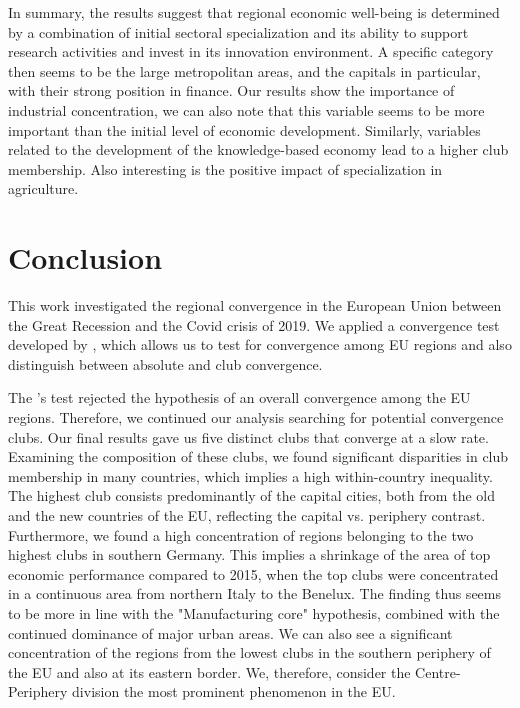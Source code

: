 \documentclass[11pt]{article}
\begin{document}
In summary, the results suggest that regional economic well-being is determined by a combination of initial sectoral specialization and its ability to support research activities and invest in its innovation environment. A specific category then seems to be the large metropolitan areas, and the capitals in particular, with their strong position in finance. Our results show the importance of industrial concentration, we can also note that this variable seems to be more important than the initial level of economic development. Similarly, variables related to the development of the knowledge-based economy lead to a higher club membership. Also interesting is the positive impact of specialization in agriculture. 

\section{Conclusion}

This work investigated the regional convergence in the European Union between the Great Recession and the Covid crisis of 2019. We applied a convergence test developed by \citet{phillips2009economic}, which allows us to test for convergence among EU regions and also distinguish between absolute and club convergence.

The \citeauthor{phillips2009economic}'s test rejected the hypothesis of an overall convergence among the EU regions. Therefore, we continued our analysis searching for potential convergence clubs. Our final results gave us five distinct clubs 
that converge at a slow rate. Examining the composition of these clubs, we found significant disparities in club membership in many countries, which implies a high within-country inequality. The highest club consists predominantly of the capital cities, both from the old and the new countries of the EU, reflecting the capital vs. periphery contrast. Furthermore, we found a high concentration of regions belonging to the two highest clubs in southern Germany. This implies a shrinkage of the area of top economic performance compared to 2015, when the top clubs were concentrated in a continuous area from northern Italy to the Benelux. The finding thus seems to be more in line with the "Manufacturing core" hypothesis, combined with the continued dominance of major urban areas. We can also see a significant concentration of the regions from the lowest clubs in the southern periphery of the EU and also at its eastern border. We, therefore, consider the Centre-Periphery division the most prominent phenomenon in the EU.
\end{document}
